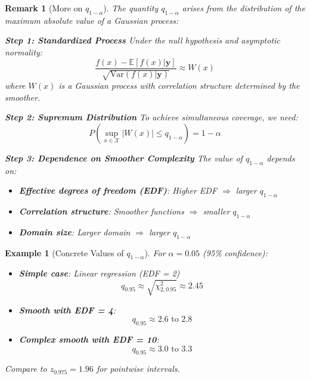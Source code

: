 \documentclass[12pt]{article}
\newtheorem{remark}{Remark}
\newtheorem{example}{Example}
\begin{document}
\begin{remark}[More on $q_{1-\alpha}$]
The quantity $q_{1-\alpha}$ arises from the distribution of the maximum absolute value of a Gaussian process:

\textbf{Step 1: Standardized Process}
Under the null hypothesis and asymptotic normality:
\begin{equation}
\frac{f(x) - \mathbb{E}[f(x)|\mathbf{y}]}{\sqrt{\text{Var}(f(x)|\mathbf{y})}} \approx W(x)
\end{equation}
where $W(x)$ is a Gaussian process with correlation structure determined by the smoother.

\textbf{Step 2: Supremum Distribution}
To achieve simultaneous coverage, we need:
\begin{equation}
P\left(\sup_{x \in \mathcal{X}} |W(x)| \leq q_{1-\alpha}\right) = 1-\alpha
\end{equation}

\textbf{Step 3: Dependence on Smoother Complexity}
The value of $q_{1-\alpha}$ depends on:
\begin{itemize}
   \item \textbf{Effective degrees of freedom (EDF)}: Higher EDF $\Rightarrow$ larger $q_{1-\alpha}$
   \item \textbf{Correlation structure}: Smoother functions $\Rightarrow$ smaller $q_{1-\alpha}$
   \item \textbf{Domain size}: Larger domain $\Rightarrow$ larger $q_{1-\alpha}$
\end{itemize}
\end{remark}

\begin{example}[Concrete Values of $q_{1-\alpha}$]
For $\alpha = 0.05$ (95\% confidence):
\begin{itemize}
   \item \textbf{Simple case}: Linear regression (EDF = 2)
   \begin{equation}
   q_{0.95} \approx \sqrt{\chi^2_{2,0.95}} \approx 2.45
   \end{equation}
   
   \item \textbf{Smooth with EDF = 4}:
   \begin{equation}
   q_{0.95} \approx 2.6 \text{ to } 2.8
   \end{equation}
   
   \item \textbf{Complex smooth with EDF = 10}:
   \begin{equation}
   q_{0.95} \approx 3.0 \text{ to } 3.3
   \end{equation}
\end{itemize}
Compare to $z_{0.975} = 1.96$ for pointwise intervals.
\end{example}
\end{document}
